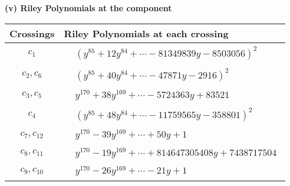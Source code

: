 \documentclass[1p]{elsarticle_modified}
\theoremstyle{definition}
\begin{document}
\newpage\renewcommand{\arraystretch}{1}
\flushleft \textbf{(v) Riley Polynomials at the component}\newline \\
\begin{tabular}{m{50pt}|m{274pt}}
Crossings & \hspace{64pt}Riley Polynomials at each crossing \\
\hline $$\begin{aligned}c_{1}\end{aligned}$$&$\begin{aligned}
&(y^{85}+12 y^{84}+\cdots-81349839 y-8503056)^{2}
\end{aligned}$\\
\hline $$\begin{aligned}c_{2},c_{6}\end{aligned}$$&$\begin{aligned}
&(y^{85}+40 y^{84}+\cdots-47871 y-2916)^{2}
\end{aligned}$\\
\hline $$\begin{aligned}c_{3},c_{5}\end{aligned}$$&$\begin{aligned}
&y^{170}+38 y^{169}+\cdots-5724363 y+83521
\end{aligned}$\\
\hline $$\begin{aligned}c_{4}\end{aligned}$$&$\begin{aligned}
&(y^{85}+48 y^{84}+\cdots-11759565 y-358801)^{2}
\end{aligned}$\\
\hline $$\begin{aligned}c_{7},c_{12}\end{aligned}$$&$\begin{aligned}
&y^{170}-39 y^{169}+\cdots+50 y+1
\end{aligned}$\\
\hline $$\begin{aligned}c_{8},c_{11}\end{aligned}$$&$\begin{aligned}
&y^{170}-19 y^{169}+\cdots+814647305408 y+7438717504
\end{aligned}$\\
\hline $$\begin{aligned}c_{9},c_{10}\end{aligned}$$&$\begin{aligned}
&y^{170}-26 y^{169}+\cdots-21 y+1
\end{aligned}$\\
\hline
\end{tabular}\\~\\
\end{document}
